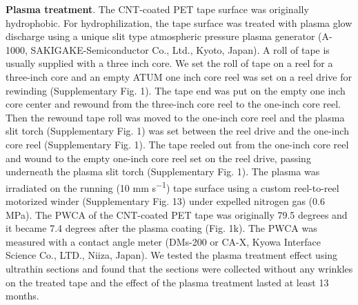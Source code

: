 \documentclass{article}
\begin{document}
\textbf{Plasma treatment}. The CNT-coated PET tape surface was originally hydrophobic. For hydrophilization, the tape surface was treated with plasma glow discharge using a unique slit type atmospheric pressure plasma generator (A-1000, SAKIGAKE-Semiconductor Co., Ltd., Kyoto, Japan). A roll of tape is usually supplied with a three inch core. We set the roll of tape on a reel for a three-inch core and an empty ATUM one inch core reel was set on a reel drive for rewinding (Supplementary Fig. 1). The tape end was put on the empty one inch core center and rewound from the three-inch core reel to the one-inch core reel. Then the rewound tape roll was moved to the one-inch core reel and the plasma slit torch (Supplementary Fig. 1) was set between the reel drive and the one-inch core reel (Supplementary Fig. 1). The tape reeled out from the one-inch core reel and wound to the empty one-inch core reel set on the reel drive, passing underneath the plasma slit torch (Supplementary Fig. 1). The plasma was irradiated on the running (10 mm s\textsuperscript{−1}) tape surface using a custom reel-to-reel motorized winder (Supplementary Fig. 13) under expelled nitrogen gas (0.6 MPa). The PWCA of the CNT-coated PET tape was originally 79.5 degrees and it became 7.4 degrees after the plasma coating (Fig. 1k). The PWCA was measured with a contact angle meter (DMs-200 or CA-X, Kyowa Interface Science Co., LTD., Niiza, Japan). We tested the plasma treatment effect using ultrathin sections and found that the sections were collected without any wrinkles on the treated tape and the effect of the plasma treatment lasted at least 13 months.
\end{document}
